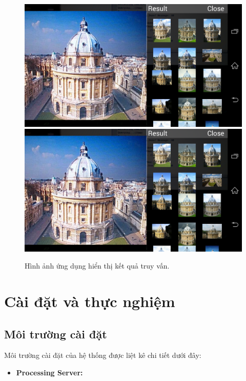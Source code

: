 {\begin{figure}[!htbp]
  \begin{center}
    \leavevmode
    \ifpdf
      \includegraphics[scale=0.17]{result_capture}
    \else
      \includegraphics[scale=0.17]{result_capture}
    \fi
    \caption[Hình ảnh ứng dụng hiển thị kết quả truy vấn]{Hình ảnh ứng dụng hiển thị kết quả truy vấn.}
    \label{FigResultCapture}
  \end{center}
\end{figure}

\section{Cài đặt và thực nghiệm}
\label{c5-caidat}
	\subsection{Môi trường cài đặt}
	Môi trường cài đặt của hệ thống được liệt kê chi tiết dưới đây:
	
	\begin{itemize}
	\item \textbf{Processing Server:}
	

\end{itemize}}
